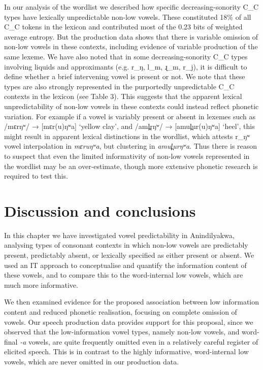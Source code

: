 \documentclass[output=paper,colorlinks,citecolor=brown]{langscibook}
\begin{document}
In our analysis of the wordlist we described how specific decreasing-sonority C\_C types have lexically unpredictable non-low vowels. These constituted 18\% of all C\_C tokens in the lexicon and contributed most of the 0.23 bits of weighted average entropy. But the production data shows that there is variable omission of non-low vowels in these contexts, including evidence of variable production of the same lexeme. We have also noted that in some decreasing-sonority C\_C types involving liquids and approximants (e.g. r\_ŋ, l\_m, ɻ\_m, r\_j), it is difficult to define whether a brief intervening vowel is present or not. We note that these types are also strongly represented in the purportedly unpredictable C\_C contexts in the lexicon (see Table 3). This suggests that the apparent lexical unpredictability of non-low vowels in these contexts could instead reflect phonetic variation. For example if a vowel is variably present or absent in lexemes such as /mɛrŋʷ/ → [mɛr(u)ŋʷa] ‘yellow clay’, and /aml̪rŋʷ/ → [amul̪ur(u)ŋʷa] ‘heel’, this might result in apparent lexical distinctions in the wordlist, which attests r\_ŋʷ vowel interpolation in \textit{mɛruŋʷa}, but clustering in \textit{amul̪urŋʷa}. Thus there is reason to suspect that even the limited informativity of non-low vowels represented in the wordlist may be an over-estimate, though more extensive phonetic research is required to test this.

\section{Discussion and conclusions}\label{sec:mansfield:6}


In this chapter we have investigated vowel predictability in Anindilyakwa, analysing types of consonant contexts in which non-low vowels are predictably present, predictably absent, or lexically specified as either present or absent. We used an IT approach to conceptualise and quantify the information content of these vowels, and to compare this to the word-internal low vowels, which are much more informative.

We then examined evidence for the proposed association between low information content and reduced phonetic realisation, focusing on complete omission of vowels. Our speech production data provides support for this proposal, since we observed that the low-information vowel types, namely non-low vowels, and word-final \textit{{}-a} vowels, are quite frequently omitted even in a relatively careful register of elicited speech. This is in contrast to the highly informative, word-internal low vowels, which are never omitted in our production data.
\end{document}

